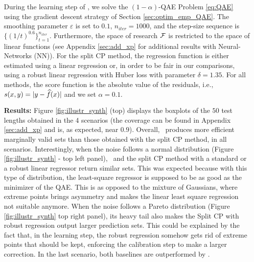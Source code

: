 During the learning step of \method, we solve the $(1-\alpha)$-QAE Problem \eqref{eq:QAE} using the gradient descent strategy of Section \ref{sec:optim_emp_QAE}. The smoothing parameter $\varepsilon$ is set to $0.1$, $n_{iter}=1000$, and the step-size sequence is $\{(1/t)^{0.6}\}^{n_{iter}}_{t=1}$. Furthermore, the space of research $\mathcal{F}$ is restricted to the space of linear functions (see Appendix \ref{sec:add_xp} for additional results with Neural-Networks (NN)). For the split CP method, the regression function is either estimated using a linear regression or, in order to be fair in our comparisons, using a robust linear regression with Huber loss with parameter $\delta=1.35$. For all methods, the score function is the absolute value of the residuals, i.e., $s(x, y) = \lvert y - {\widehat{f}}(x) \rvert$ and we set $\alpha = 0.1$.

\textbf{Results:}
Figure \ref{fig:illustr_synth} (top) displays the boxplots of the $50$ test lengths obtained in the 4 scenarios (the coverage can be found in Appendix \ref{sec:add_xp} and is, as expected, near $0.9$). Overall, \method~produces more efficient marginally valid sets than those obtained with the split CP method, in all scenarios. Interestingly, when the noise follows a normal distribution (Figure \ref{fig:illustr_synth} - top left panel), \method~and the split CP method with a standard or a robust linear regressor return similar sets. This was expected because with this type of distribution, the least-square regressor is supposed to be as good as the minimizer of the QAE. This is as opposed to the mixture of Gaussians, where extreme points brings asymmetry and makes the linear least square regression not suitable anymore. When the noise follows a Pareto distribution (Figure \ref{fig:illustr_synth} top right panel), its heavy tail also makes the Split CP with robust regression output larger prediction sets. This could be explained by the fact that, in the learning step, the robust regression somehow gets rid of extreme points that should be kept, enforcing the calibration step to make a larger correction. In the last scenario, both baselines are outperformed by \method.

